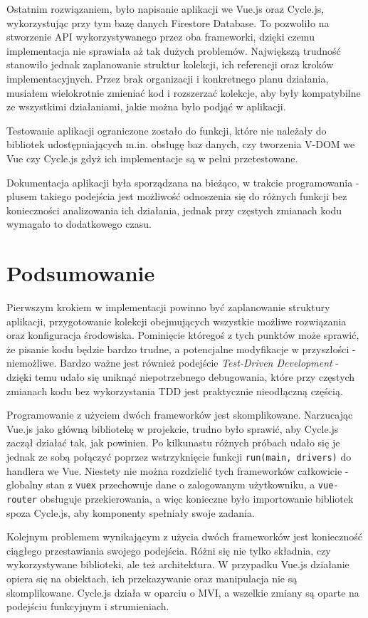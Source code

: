 \documentclass[shortabstract]{iithesis}
\theoremstyle{definition} \newtheorem{definition}{Definicja}[]
\theoremstyle{remark} \newtheorem{remark}[definition]{Observation}
\theoremstyle{plain} \newtheorem{theorem}[definition]{Theorem}
\theoremstyle{plain} \newtheorem{lemma}[definition]{Lemma}
\begin{document}
Ostatnim rozwiązaniem, było napisanie aplikacji we Vue.js oraz Cycle.js, wykorzystując przy tym bazę danych Firestore Database. To pozwoliło na stworzenie API wykorzystywanego przez oba frameworki, dzięki czemu implementacja nie sprawiała aż tak dużych problemów. Największą trudność stanowiło jednak zaplanowanie struktur kolekcji, ich referencji oraz kroków implementacyjnych. Przez brak organizacji i konkretnego planu działania, musiałem wielokrotnie zmieniać kod i rozszerzać kolekcje, aby były kompatybilne ze wszystkimi działaniami, jakie można było podjąć w aplikacji.

Testowanie aplikacji ograniczone zostało do funkcji, które nie należały do bibliotek udostępniających m.in. obsługę baz danych, czy tworzenia V-DOM we Vue czy Cycle.js gdyż ich implementacje są w pełni przetestowane.

Dokumentacja aplikacji była sporządzana na bieżąco, w trakcie programowania - plusem takiego podejścia jest możliwość odnoszenia się do różnych funkcji bez konieczności analizowania ich działania, jednak przy częstych zmianach kodu wymagało to dodatkowego czasu.

\chapter{Podsumowanie}
Pierwszym krokiem w implementacji powinno być zaplanowanie struktury aplikacji, przygotowanie kolekcji obejmujących wszystkie możliwe rozwiązania oraz konfiguracja środowiska. Pominięcie któregoś z tych punktów może sprawić, że pisanie kodu będzie bardzo trudne, a potencjalne modyfikacje w przyszłości - niemożliwe. Bardzo ważne jest również podejście \textit{Test-Driven Development} - dzięki temu udało się uniknąć niepotrzebnego debugowania, które przy częstych zmianach kodu bez wykorzystania TDD jest praktycznie nieodłączną częścią.

Programowanie z użyciem dwóch frameworków jest skomplikowane. Narzucając Vue.js jako główną bibliotekę w projekcie, trudno było sprawić, aby Cycle.js zaczął działać tak, jak powinien. Po kilkunastu różnych próbach udało się je jednak ze sobą połączyć poprzez wstrzyknięcie funkcji \texttt{run(main, drivers)} do handlera we Vue. Niestety nie można rozdzielić tych frameworków całkowicie - globalny stan z \texttt{vuex} przechowuje dane o zalogowanym użytkowniku, a \texttt{vue-router} obsługuje przekierowania, a więc konieczne było importowanie bibliotek spoza Cycle.js, aby komponenty spełniały swoje zadania.

Kolejnym problemem wynikającym z użycia dwóch frameworków jest konieczność ciągłego przestawiania swojego podejścia. Różni się nie tylko składnia, czy wykorzystywane biblioteki, ale też architektura. W przypadku Vue.js działanie opiera się na obiektach, ich przekazywanie oraz manipulacja nie są skomplikowane. Cycle.js działa w oparciu o MVI, a wszelkie zmiany są oparte na podejściu funkcyjnym i strumieniach.
\end{document}

